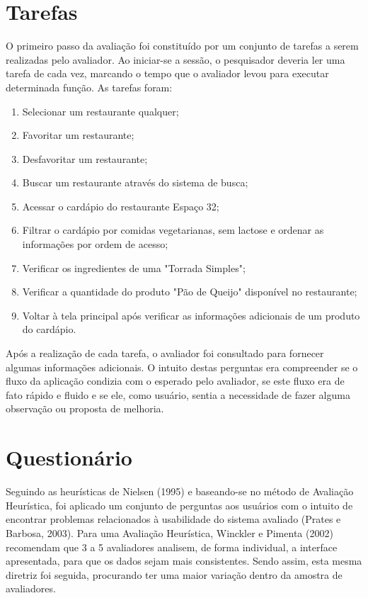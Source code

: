 \section{Tarefas}
O primeiro passo da avaliação foi constituído por um conjunto de tarefas a serem realizadas pelo avaliador. Ao iniciar-se a sessão, o pesquisador deveria ler uma tarefa de cada vez, marcando o tempo que o avaliador levou para executar determinada função. As tarefas foram:
\begin{enumerate}
	\item Selecionar um restaurante qualquer;
	\item Favoritar um restaurante;
	\item Desfavoritar um restaurante;
	\item Buscar um restaurante através do sistema de busca;
	\item Acessar o cardápio do restaurante Espaço 32;
	\item Filtrar o cardápio por comidas vegetarianas, sem lactose e ordenar as informações por ordem de acesso;
	\item Verificar os ingredientes de uma "Torrada Simples";
	\item Verificar a quantidade do produto "Pão de Queijo" disponível no restaurante;
	\item Voltar à tela principal após verificar as informações adicionais de um produto do cardápio.
\end{enumerate}
Após a realização de cada tarefa, o avaliador foi consultado para fornecer algumas informações adicionais. O intuito destas perguntas era compreender se o fluxo da aplicação condizia com o esperado pelo avaliador, se este fluxo era de fato rápido e fluido e se ele, como usuário, sentia a necessidade de fazer alguma observação ou proposta de melhoria.

\section{Questionário}

Seguindo as heurísticas de Nielsen (1995)\nocite{NIELSEN1995} e baseando-se no método de Avaliação Heurística, foi aplicado um conjunto de perguntas aos usuários com o intuito de encontrar problemas relacionados à usabilidade do sistema avaliado (Prates e Barbosa, 2003). Para uma Avaliação Heurística, Winckler e Pimenta (2002) recomendam que 3 a 5 avaliadores analisem, de forma individual, a interface apresentada, para que os dados sejam mais consistentes. Sendo assim, esta mesma diretriz foi seguida, procurando ter uma maior variação dentro da amostra de avaliadores.

